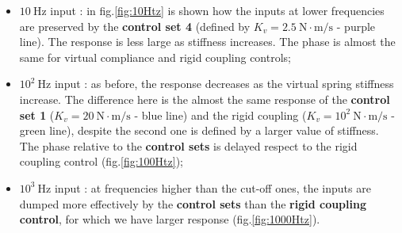 \begin{itemize}
\item $ 10 \ \text{Hz} $ input : in fig.\ref{fig:10Htz} is shown how the inputs at lower frequencies are preserved by the \textbf{control set 4} (defined by $ K_v = 2.5 \ \text{N}\cdot\text{m/s} $ - purple line). The response is less large as stiffness increases. The phase is almost the same for virtual compliance and rigid coupling controls;
\item $10^{2} \ \text{Hz}$ input : as before, the response decreases as the virtual spring stiffness increase. The difference here is the almost the same response of the \textbf{control set 1} ($ K_v = 20 \ \text{N}\cdot\text{m/s} $ - blue line) and the rigid coupling ($ K_v = 10^2 \ \text{N}\cdot\text{m/s} $ - green line), despite the second one is defined by a larger value of stiffness. The phase relative to the \textbf{control sets} is delayed respect to the rigid coupling control (fig.\ref{fig:100Htz});
\item $10^{3} \ \text{Hz}$ input : at frequencies higher than the cut-off ones, the
inputs are dumped more effectively by the \textbf{control sets} than the \textbf{rigid coupling control}, for which we have larger response (fig.\ref{fig:1000Htz}).
\end{itemize}

